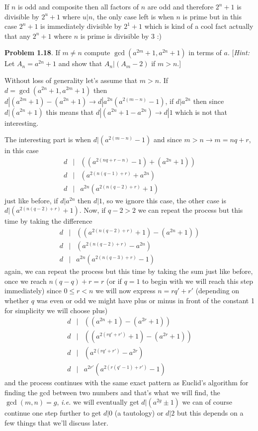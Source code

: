 \documentclass[aps,preprint,preprintnumbers,nofootinbib,showpacs,prd]{revtex4-1}
\newcommand{\ie}{{\it i.e.} }
\newcommand{\nbea}{\begin{eqnarray*}}
\newcommand{\neea}{\end{eqnarray*}}
\begin{document}
If $n$ is odd and composite then all factors of $n$ are odd and therefore $2^n+1$ is divisible by $2^u+1$ where $u|n$, the only case left is when $n$ is prime but in this case $2^n+1$ is immediately divisible by $2^1 + 1$ which is kind of a cool fact actually that any $2^n+1$ where $n$ is prime is divisible by 3 :)

{\bf Problem 1.18}. If $m\neq n$ compute $\gcd\left( a^{2m}+1, a^{2n}+1\right)$ in terms of $a$. [{\it Hint:} Let $A_n = a^{2n}+1$ and show that $A_n|(A_m-2)$ if $m>n$.]

Without loss of generality let's assume that $m > n$. If $d = \gcd(a^{2n}+1, a^{2m}+1)$ then $d|(a^{2m}+1) - (a^{2n}+1) \to d|a^{2n}(a^{2(m-n)} - 1)$, if $d|a^{2n}$ then since $d|(a^{2n}+1)$ this means that $d|(a^{2n}+1 - a^{2n}) \to d|1$ which is not that interesting.

The interesting part is when $d|(a^{2(m-n)} - 1)$ and since $m > n \to m = nq + r$, in this case 
%
\nbea
d &|& ((a^{2(nq+r-n)} - 1) + (a^{2n} + 1)) \\
d &|& (a^{2(n(q-1)+r)} + a^{2n}) \\
d &|& a^{2n}(a^{2(n(q-2)+r)} + 1)
\neea
%
just like before, if $d|a^{2n}$ then $d|1$, so we ignore this case, the other case is $d | (a^{2(n(q-2)+r)} + 1)$. Now, if $q-2 > 2$ we can repeat the process but this time by taking the difference
%
\nbea
d &|& ((a^{2(n(q-2)+r)} + 1) - (a^{2n} + 1)) \\
d &|& (a^{2(n(q-2)+r)} - a^{2n}) \\
d &|& a^{2n}(a^{2(n(q-3)+r)} - 1)
\neea
%
again, we can repeat the process but this time by taking the sum just like before, once we reach $n(q-q) + r = r$ (or if $q=1$ to begin with we will reach this step immediately) since $0 \le r < n$ we will now express $n = rq' + r'$ (depending on whether $q$ was even or odd we might have plus or minus in front of the constant 1 for simplicity we will choose plus)
%
\nbea
d &|& ((a^{2n} + 1) - (a^{2r} + 1)) \\
d &|& ((a^{2(rq'+r')} + 1) - (a^{2r} + 1)) \\
d &|& (a^{2(rq'+r')} - a^{2r}) \\
d &|& a^{2r'}(a^{2(r(q'-1)+r')} - 1)
\neea
%
and the process continues with the same exact pattern as Euclid's algorithm for finding the gcd between two numbers and that's what we will find, the $\gcd(m,n) = g$, \ie we will eventually get $d|(a^{2g} \pm 1)$ we can of course continue one step further to get $d|0$ (a tautology) or $d|2$ but this depends on a few things that we'll discuss later.
\end{document}
